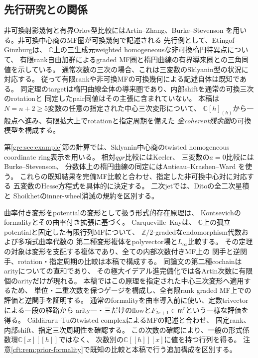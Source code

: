 \subsection{先行研究との関係}
非可換射影幾何と有界Orlov型比較にはArtin--Zhang、Burke--Stevenson
\cite{LP-AZ,LP-BS}を用いる。非可換中心商のMF圏が可換幾何で記述される
先行例として、Etingof--Ginzburg\cite[Sections~3.5--3.6, Theorem~3.6.2(i)]{EG}は、
$\mathbb C$上の三生成元weighted homogeneousな非可換楕円特異点について、
有限rank自由加群によるgraded MF圏と楕円曲線の有界導来圏との三角同値を示している。
通常次数の三次の場合、これは三変数のSklyanin型の状況に対応する。
従って有限rankや非可換MFの可換幾何による記述自体は既知である。
同定理のtargetは楕円曲線全体の導来圏であり、内部shiftを通常の可換三次のrotationと
同定したpair同値はその主張に含まれていない。
本稿は$N=n+2\ge5$変数の任意の指定された中心三次変形について、
$\mathbb C[h]_{(h)}$から一般点へ進み、有限拡大上でrotationと指定周期を備えた
\emph{全coherent残余圏}の可換模型を構成する。

第\ref{gre:sec:example}節の計算では、Sklyanin中心商のtwisted homogeneous
coordinate ring表示\cite{GRSklyaninATV,GRSklyaninST}を用いる。
相対$qgr$比較にはKeeler\cite[Proposition~7.2, Lemma~7.6]{GRKeeler}、
三変数の$a=0$比較にはBurke--Stevenson\cite[Theorem~6.4(3)]{LP-BS}、
分数体上の楕円曲線の同定にはAntieau--Krashen--Ward
\cite[Theorem~2.2]{GRAKW}を使う。
これらの既知結果を完備MF比較と合わせ、指定した非可換中心対に対応する
五変数のHesse方程式を具体的に決定する。
二次jetでは、Ditoの全二次星積\cite[Section~2, equation~(3)]{GRDito}と
Shoikhetのinner-wheel消滅\cite[Section~1.3]{GRShoikhet}の規約を区別する。

曲率付き変形をpotentialの変形として扱う形式的存在原理は、
Kontsevichのformality\cite{PKontsevich}とその曲率付き拡張に基づく。
Carqueville--Kay\cite[Section~3.1, Theorem~3.1, Proposition~3.4]{CK}は、
$\mathbb C$上の孤立potentialと固定した有限行列MFについて、
$\mathbb Z/2$-gradedなendomorphism代数および多項式曲率代数の
第二種変形複体をpolyvector場と$L_\infty$比較する。
その定理の対象は変形を支配する複体であり、全ての内部次数付きMF上の
関手と逆関手、rotation・指定周期の比較は本稿で構成する。
同論文の第二種cochainはarityについての直和であり、
その極大イデアル進完備化では各Artin次数に有限個のarityだけが現れる。
本稿ではこの原理を指定された中心三次変形へ適用するため、
単位・二重次数を保つゲージを構成し、全有限rank graded MF上での評価と逆関手を証明する。
通常のformalityを曲率導入前に使い、定数trivectorによる一段の経路から
arity一・三だけのflowと$F_{2r+1}\in\mathfrak m^r$という一様な評価を得る。
Căldăraru--Tuのtwisted complexによるMFの記述\cite[Section~2]{CT}と合わせ、
固定rank、内部shift、指定三次周期性を確認する。
この次数の確認により、一般の形式係数環$\mathbb C[x][[h]]$ではなく、
次数別の$\mathbb C[[h]][x]$に値を持つ行列を得る。
注意\ref{cft:rem:prior-formality}で既知の比較と本稿で行う追加構成を区別する。

